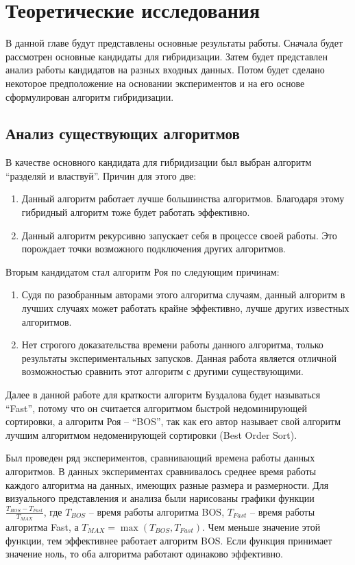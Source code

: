 \chapter{Теоретические исследования}
\label{chapter2}

В данной главе будут представлены основные результаты работы. Сначала будет рассмотрен основные кандидаты для
гибридизации. Затем будет представлен анализ работы кандидатов на разных входных данных. Потом будет сделано
некоторое предположение на основании экспериментов и на его основе сформулирован алгоритм гибридизации.

\section{Анализ существующих алгоритмов}

В качестве основного кандидата для гибридизации был выбран алгоритм ``разделяй и властвуй''. Причин для этого две:

\begin{enumerate}
 \item Данный алгоритм работает лучше большинства алгоритмов. Благодаря этому гибридный алгоритм тоже будет работать эффективно.
 \item Данный алгоритм рекурсивно запускает себя в процессе своей работы. Это порождает точки возможного подключения других алгоритмов.
\end{enumerate}

Вторым кандидатом стал алгоритм Роя по следующим причинам:

\begin{enumerate}
 \item Судя по разобранным авторами этого алгоритма случаям, данный алгоритм в лучших случаях может работать крайне эффективно, лучше других известных алгоритмов.
 \item Нет строгого доказательства времени работы данного алгоритма, только результаты экспериментальных запусков. Данная работа является отличной возможностью сравнить этот алгоритм с другими существующими.
\end{enumerate}

Далее в данной работе для краткости алгоритм Буздалова будет называться ``Fast'', потому что он считается алгоритмом
быстрой недоминирующей сортировки, а алгоритм Роя -- ``BOS'', так как его автор называет свой алгоритм лучшим
алгоритмом недоменирующей сортировки (Best Order Sort).

Был проведен ряд экспериментов, сравнивающий времена работы данных алгоритмов. В данных экспериментах сравнивалось
среднее время работы каждого алгоритма на данных, имеющих разные размера и размерности. Для визуального представления
и анализа были нарисованы графики функции $\frac{T_{BOS} - T_{Fast}}{T_{MAX}}$, где $T_{BOS}$ -- время работы алгоритма
BOS, $T_{Fast}$ -- время работы алгоритма Fast, а $T_{MAX} = \max(T_{BOS}, T_{Fast})$. Чем меньше значение этой
функции, тем эффективнее работает алгоритм BOS. Если функция принимает значение ноль, то оба алгоритма работают
одинаково эффективно.

